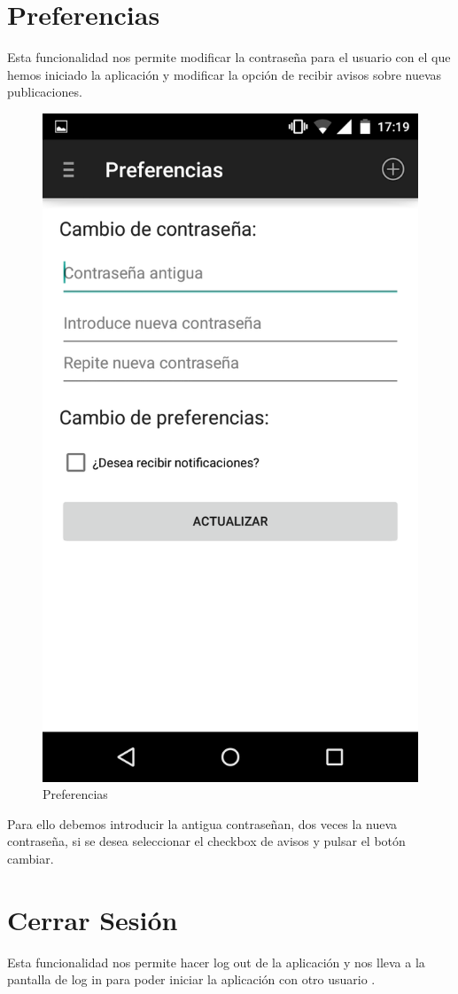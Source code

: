 \documentclass[11pt,a4paper, titlepage]{article}
\begin{document}
	\section[Preferencias]{Preferencias}
	
	Esta funcionalidad nos permite modificar la contraseña para el usuario con el que hemos iniciado la aplicación y modificar la opción de recibir avisos sobre nuevas publicaciones.
	
	\begin{figure}[hbtp]
		\centering
		\includegraphics[scale = 0.25 ]{img/9}
		\caption{Preferencias}
		\label{p1}
	\end{figure}
	
	Para ello debemos introducir la antigua contraseñan, dos veces la nueva contraseña, si se desea seleccionar el checkbox de avisos y pulsar el botón cambiar.
	
	\section[Cerrar Sesión]{Cerrar Sesión}
	Esta funcionalidad nos permite hacer log out de la aplicación y nos lleva a la pantalla de log in para poder iniciar la aplicación con otro usuario . 
	
\end{document}
